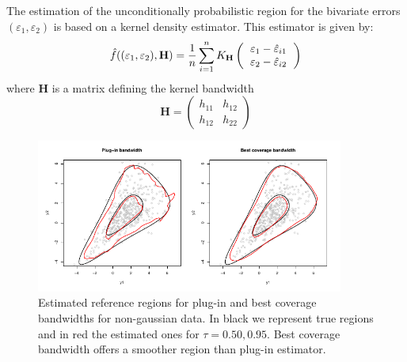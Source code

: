 The estimation of the unconditionally probabilistic region for the  bivariate errors $(\varepsilon_1,\varepsilon_2)$ is based on a kernel density estimator. This estimator is given by:
\begin{equation}
\hat{f}((\varepsilon_{1},\varepsilon_{2}),\textbf{H}) = \frac{1}{n}\sum_{i=1}^{n}K_{\textbf{H}}
\left({
	\begin{tabular} {c}
	$\varepsilon_1 - \hat{\varepsilon}_{i1}$ \\
	$\varepsilon_2 - \hat{\varepsilon}_{i2}$\\
	\end{tabular}
}\right)
\end{equation}
\noindent where \textbf{H} is a matrix defining the kernel bandwidth
$$
\textbf{H} = \begin{pmatrix} h_{11} & h_{12} \\ h_{12} & h_{22} \end{pmatrix}
$$
\begin{figure}[!htb]
	\centering
	\includegraphics[width=0.90\textwidth]{Fig1.pdf}
	\caption{Estimated reference regions for plug-in and best coverage bandwidths for non-gaussian data. In black we represent true regions and in red the estimated ones for $\tau = 0.50, 0.95$. Best coverage bandwidth offers a smoother region than plug-in estimator.}
	\label{H}
\end{figure}


